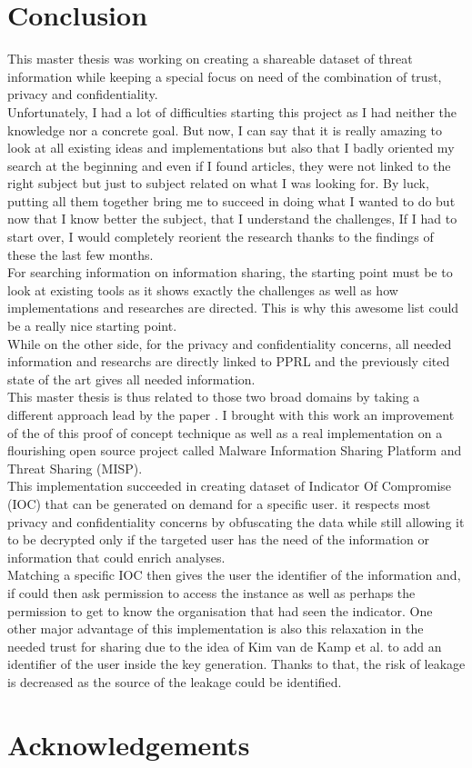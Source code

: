 \documentclass{eplmastersthesis}
\begin{document}
\section{Conclusion}
This master thesis was working on creating a shareable dataset of threat information while keeping a special focus on need of the combination of trust, privacy and confidentiality.\\
Unfortunately, I had a lot of difficulties starting this project as I had neither the knowledge nor a concrete goal. But now, I can say that it is really amazing to look at all existing ideas and implementations but also that I badly oriented my search at the beginning and even if I found articles, they were not linked to the right subject but just to subject related on what I was looking for. By luck, putting all them together bring me to succeed in doing what I wanted to do but now that I know better the subject, that I understand the challenges, If I had to start over, I would completely reorient the research thanks to the findings of these the last few months.\\
For searching information on information sharing, the starting point must be to look at existing tools as it shows exactly the challenges as well as how implementations and researches are directed. This is why this awesome list \cite{AwesomeTreat} could be a really nice starting point.\\
While on the other side, for the privacy and confidentiality concerns, all needed information and researchs are directly linked to PPRL and the previously cited state of the art \cite{vatsalanprivacy} gives all needed information.\\

This master thesis is thus related to those two broad domains by taking a different approach lead by the paper \cite{van2016private}. I brought with this work an improvement of the of this proof of concept technique as well as a real implementation on a flourishing open source project called Malware Information Sharing Platform and Threat Sharing (MISP).\\
This implementation succeeded in creating dataset of Indicator Of Compromise (IOC) that can be generated on demand for a specific user. it respects most privacy and confidentiality concerns by obfuscating the data while still allowing it to be decrypted only if the targeted user has the need of the information or information that could enrich analyses.\\
Matching a specific IOC then gives the user the identifier of the information and, if could then ask permission to access the instance as well as perhaps the permission to get to know the organisation that had seen the indicator.
One other major advantage of this implementation is also this relaxation in the needed trust for sharing due to the idea of Kim van de Kamp et al. to add an identifier of the user inside the key generation. Thanks to that, the risk of leakage is decreased as the source of the leakage could be identified.\\



\section{Acknowledgements}

\newpage


\newpage

\backcoverpage
\end{document}
